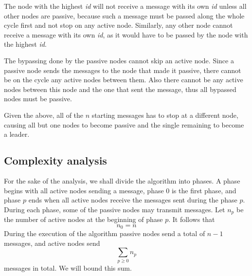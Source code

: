 \documentclass{article}
\begin{document}
The node with the highest \textit{id} will not receive a message with its own \textit{id} unless all other nodes are passive, because such a message must be passed along the whole cycle first and not stop on any active node. Similarly, any other node cannot receive a message with its own \textit{id}, as it would have to be passed by the node with the highest \textit{id}.

The bypassing done by the passive nodes cannot skip an active node. Since a passive node sends the messages to the node that made it passive, there cannot be on the cycle any active nodes between them. Also there cannot be any active nodes between this node and the one that sent the message, thus all bypassed nodes must be passive.

Given the above, all of the $n$ starting messages has to stop at a different node, causing all but one nodes to become passive and the single remaining to become a leader.

\subsection*{Complexity analysis}
For the sake of the analysis, we shall divide the algorithm into phases. A phase begins with all active nodes sending a message, phase 0 is the first phase, and phase $p$ ends when all active nodes receive the messages sent during the phase $p$. During each phase, some of the passive nodes may transmit messages. Let $n_p$ be the number of active nodes at the beginning of phase $p$. It follows that
\begin{equation}
n_0=n
\end{equation}
During the execution of the algorithm passive nodes send a total of $n-1$ messages, and active nodes send
$$\sum_{p\geqslant 0} n_p$$
messages in total. We will bound this sum.
\end{document}
